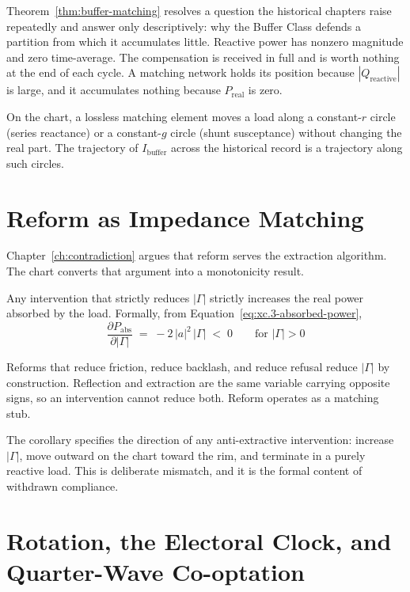 Theorem~\ref{thm:buffer-matching} resolves a question the historical chapters raise repeatedly and
answer only descriptively: why the Buffer Class defends a partition from which it accumulates
little. Reactive power has nonzero magnitude and zero time-average. The compensation is received in
full and is worth nothing at the end of each cycle. A matching network holds its position because
$|Q_{\text{reactive}}|$ is large, and it accumulates nothing because $P_{\text{real}}$ is zero.

On the chart, a lossless matching element moves a load along a constant-$r$ circle (series
reactance) or a constant-$g$ circle (shunt susceptance) without changing the real part. The
trajectory of $I_{\text{buffer}}$ across the historical record is a trajectory along such circles.

\section{Reform as Impedance Matching}
\label{sec:xc_reform}

Chapter~\ref{ch:contradiction} argues that reform serves the extraction algorithm. The chart
converts that argument into a monotonicity result.

\begin{theorem}
\label{thm:reform-monotonicity}
Any intervention that strictly reduces $|\Gamma|$ strictly increases the real power absorbed by the
load. Formally, from Equation~\ref{eq:xc.3-absorbed-power},
\begin{equation}\label{eq:xc.7-reform-monotonicity}
\frac{\partial P_{\text{abs}}}{\partial |\Gamma|} \;=\; -2\,|a|^2\,|\Gamma| \;<\; 0
\qquad \text{for } |\Gamma| > 0
\end{equation}
\end{theorem}

Reforms that reduce friction, reduce backlash, and reduce refusal reduce $|\Gamma|$ by construction.
Reflection and extraction are the same variable carrying opposite signs, so an intervention cannot
reduce both. Reform operates as a matching stub.

The corollary specifies the direction of any anti-extractive intervention: increase $|\Gamma|$, move
outward on the chart toward the rim, and terminate in a purely reactive load. This is deliberate
mismatch, and it is the formal content of withdrawn compliance.

\section{Rotation, the Electoral Clock, and Quarter-Wave Co-optation}
\label{sec:xc_rotation}

